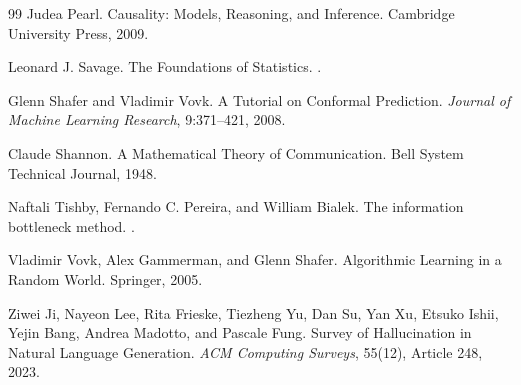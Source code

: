 \documentclass[11pt]{article}
\begin{document}
\begin{thebibliography}{99}
Judea Pearl.
\newblock Causality: Models, Reasoning, and Inference.
\newblock Cambridge University Press, 2009.

Leonard J. Savage.
\newblock The Foundations of Statistics.
.

Glenn Shafer and Vladimir Vovk.
\newblock A Tutorial on Conformal Prediction.
\newblock \emph{Journal of Machine Learning Research}, 9:371--421, 2008.

Claude Shannon.
\newblock A Mathematical Theory of Communication.
\newblock Bell System Technical Journal, 1948.

Naftali Tishby, Fernando C. Pereira, and William Bialek.
\newblock The information bottleneck method.
.

Vladimir Vovk, Alex Gammerman, and Glenn Shafer.
\newblock Algorithmic Learning in a Random World.
\newblock Springer, 2005.

Ziwei Ji, Nayeon Lee, Rita Frieske, Tiezheng Yu, Dan Su, Yan Xu, Etsuko Ishii, Yejin Bang, Andrea Madotto, and Pascale Fung.
\newblock Survey of Hallucination in Natural Language Generation.
\newblock \emph{ACM Computing Surveys}, 55(12), Article 248, 2023.

\end{thebibliography}
\end{document}
